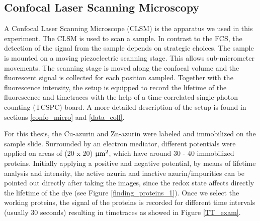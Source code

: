 \documentclass[twoside,single]{lion-msc}
\begin{document}
\subsection{Confocal Laser Scanning Microscopy}
A Confocal Laser Scanning Microscope (CLSM) is the apparatus we used in this experiment. The CLSM is used to scan a sample. In contrast to the FCS, the detection of the signal from the sample depends on strategic choices. The sample is mounted on a moving piezoelectric scanning stage. This allows sub-micrometer movements. The scanning stage is moved along the confocal volume and the fluorescent signal is collected for each position sampled. Together with the fluorescence intensity, the setup is equipped to record the lifetime of the fluorescence and timetraces with the help of a time-correlated single-photon counting (TCSPC) board. A more detailed description of the setup is found in sections \ref{confo_micro} and \ref{data_coll}.

For this thesis, the Cu-azurin and Zn-azurin were labeled and immobilized on the sample slide. Surrounded by an electron mediator, different potentials were applied on areas of (20 x 20) $\upmu \textup{m}^{2}$, which have around 30 - 40 immobilized proteins. Initially applying a positive and negative potential, by means of lifetime analysis and intensity, the active azurin and inactive azurin/impurities can be pointed out directly after taking the images, since the redox state affects directly the lifetime of the dye (see Figure \ref{finding_proteins_1}). Once we select the working proteins, the signal of the proteins is recorded for different time intervals (usually 30 seconds) resulting in timetraces as showed in Figure \ref{TT_exam}.
\end{document}
